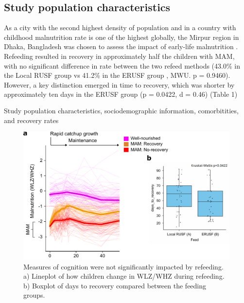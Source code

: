 \documentclass{article}
\begin{document}
\subsection{Study population characteristics}
As a city with the second highest density of population and in a country with childhood malnutrition rate is one of the highest globally, the Mirpur region in Dhaka, Bangladesh was chosen to assess the impact of early-life malnutrition \cite{ahmed2012nutrition}.
Refeeding resulted in recovery in approximately half the children with MAM, with no significant difference in rate between the two refeed methods (43.0\% in the Local RUSF group vs 41.2\% in the ERUSF group , MWU. p = 0.9460).
However, a key distinction emerged in time to recovery, which was shorter by approximately ten days in the ERUSF group (p = 0.0422, d = 0.46) (Table 1)

\begin{table}[h!]
	\centering
	\caption{Study population characteristics, sociodemographic information, comorbitities, and recovery rates}
	\label{Table1}
\end{table}

\begin{figure}[H]
	\centering
	\includegraphics[scale=1.2]{figures/anthrochange_simple.pdf}
	\caption[Measures of cognition were not significantly impacted by refeeding]{
		Measures of cognition were not significantly impacted by refeeding.
		a) Lineplot of how children change in WLZ/WHZ during refeeding.
		b) Boxplot of days to recovery compared between the feeding groups.
	}
	\label{Figure1}
\end{figure}
\end{document}
